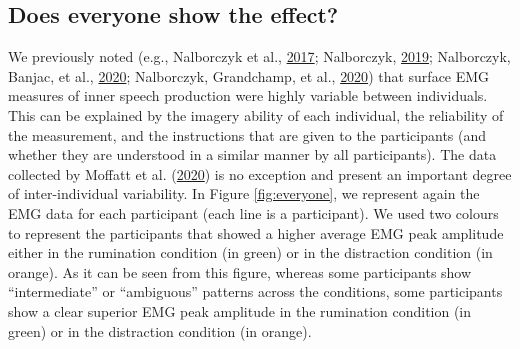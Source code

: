 \documentclass[
  english,
  man, donotrepeattitle,floatsintext]{apa6}
\begin{document}
\hypertarget{does-everyone-show-the-effect}{%
\subsection{Does everyone show the effect?}\label{does-everyone-show-the-effect}}

We previously noted (e.g., Nalborczyk et al., \protect\hyperlink{ref-nalborczyk_orofacial_2017}{2017}; Nalborczyk, \protect\hyperlink{ref-nalborczyk_understanding_2019}{2019}; Nalborczyk, Banjac, et al., \protect\hyperlink{ref-nalborczyk_dissociating_2020}{2020}; Nalborczyk, Grandchamp, et al., \protect\hyperlink{ref-nalborczyk_can_2020}{2020}) that surface EMG measures of inner speech production were highly variable between individuals. This can be explained by the imagery ability of each individual, the reliability of the measurement, and the instructions that are given to the participants (and whether they are understood in a similar manner by all participants). The data collected by Moffatt et al. (\protect\hyperlink{ref-moffatt_inner_2020}{2020}) is no exception and present an important degree of inter-individual variability. In Figure \ref{fig:everyone}, we represent again the EMG data for each participant (each line is a participant). We used two colours to represent the participants that showed a higher average EMG peak amplitude either in the rumination condition (in green) or in the distraction condition (in orange). As it can be seen from this figure, whereas some participants show ``intermediate'' or ``ambiguous'' patterns across the conditions, some participants show a clear superior EMG peak amplitude in the rumination condition (in green) or in the distraction condition (in orange).
\end{document}
